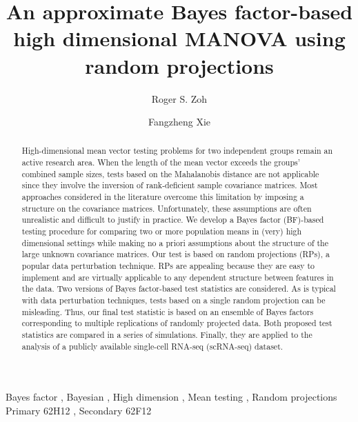 \documentclass[times,sort&compress,3p]{elsarticle}
\theoremstyle{plain}%
\theoremstyle{definition}
\begin{document}
\begin{frontmatter}

\title{An approximate Bayes factor-based high dimensional MANOVA using random projections}

\author[1]{Roger S. Zoh }
\author[2]{Fangzheng Xie}

\address[1]{Department of Epidemiology \& Biostatistics, Indiana University, Bloomington, IN 47405, USA}
\address[2]{Department of Statistics, Indiana University, Bloomington, IN 47408, USA}


\begin{abstract}
High-dimensional mean vector testing problems for two independent groups remain an active research area. When the length of the mean vector exceeds the groups' combined sample sizes, tests based on the Mahalanobis distance are not applicable since they involve the inversion of rank-deficient sample covariance matrices. Most approaches considered in the literature overcome this limitation by imposing a structure on the covariance matrices. Unfortunately, these assumptions are often unrealistic and difficult to justify in practice. 
We develop a Bayes factor (BF)-based testing procedure for comparing two or more population means in (very) high dimensional settings while making no a priori assumptions about the structure of the large unknown covariance matrices. Our test is based on random projections (RPs), a popular data perturbation technique. RPs are appealing because they are easy to implement and are virtually applicable to any dependent structure between features in the data. Two versions of Bayes factor-based test statistics are considered. As is typical with data perturbation techniques, tests based on a single random projection can be misleading. Thus, our final test statistic is based on an ensemble of Bayes factors corresponding to multiple replications of randomly projected data. Both proposed test statistics are compared in a series of simulations. Finally, they are applied to the analysis of a publicly available single-cell RNA-seq (scRNA-seq) dataset. 
\end{abstract}

\begin{keyword} %
Bayes factor \sep
Bayesian \sep
High dimension \sep
Mean testing \sep
Random projections 
\MSC[2020] Primary 62H12 \sep
Secondary 62F12
\end{keyword}

\end{frontmatter}
\end{document}
